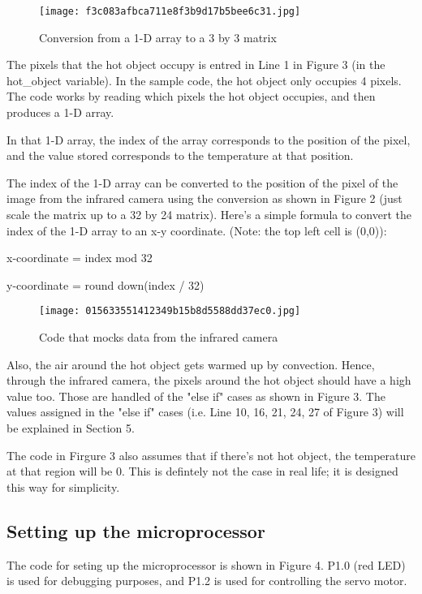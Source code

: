 \documentclass[12pt]{article}
\begin{document}
\linebreak

\begin{figure}[h]
\texttt{[image: f3c083afbca711e8f3b9d17b5bee6c31.jpg]}
\centering
\caption{Conversion from a 1-D array to a 3 by 3 matrix}
\end{figure}

The pixels that the hot object occupy is entred in Line 1 in Figure 3 (in the hot\_object variable). In the sample code, the hot object only occupies 4 pixels. The code works by reading which pixels the hot object occupies, and then produces a 1-D array. 

In that 1-D array, the index of the array corresponds to the position of the pixel, and the value stored corresponds to the temperature at that position.

The index of the 1-D array can be converted to the position of the pixel of the image from the infrared camera using the conversion as shown in Figure 2 (just scale the matrix up to a 32 by 24 matrix). Here's a simple formula to convert the index of the 1-D array to an x-y coordinate. (Note: the top left cell is (0,0)):

x-coordinate = index mod 32

y-coordinate = round down(index / 32)

\begin{figure}[h]
\texttt{[image: 015633551412349b15b8d5588dd37ec0.jpg]}
\caption{Code that mocks data from the infrared camera}
\end{figure}

Also, the air around the hot object gets warmed up by convection. Hence, through the infrared camera, the pixels around the hot object should have a high value too. Those are handled of the "else if" cases as shown in Figure 3. The values assigned in the "else if" cases (i.e. Line 10, 16, 21, 24, 27 of Figure 3) will be explained in Section 5.

The code in Firgure 3 also assumes that if there's not hot object, the temperature at that region will be 0. This is defintely not the case in real life; it is designed this way for simplicity.
\pagebreak
\subsection {Setting up the microprocessor}
The code for seting up the microprocessor is shown in Figure 4. P1.0 (red LED) is used for debugging purposes, and P1.2 is used for controlling the servo motor.
\end{document}
